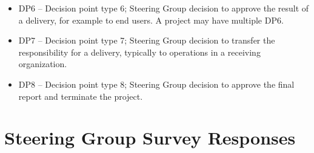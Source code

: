 \documentclass{article}
\begin{document}
\begin{appendices}
\begin{itemize}
\item DP6 – Decision point type 6; Steering Group decision to approve the result of a delivery, for example to end users. A project may have multiple DP6.

\item DP7 – Decision point type 7; Steering Group decision to transfer the responsibility for a delivery, typically to operations in a receiving organization.

\item DP8 – Decision point type 8; Steering Group decision to approve the final report and terminate the project.

\end{itemize}



\section{Steering Group Survey Responses}
\label{app:sg-resp}


\end{appendices}
\end{document}
